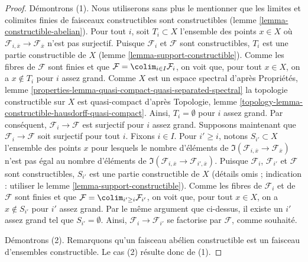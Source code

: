 \begin{proof}
Démontrons (1). Nous utiliserons sans plus le mentionner que les limites
et colimites finies de faisceaux constructibles sont constructibles
(lemme \ref{lemma-constructible-abelian}).
Pour tout $i$, soit $T_i \subset X$ l'ensemble des points $x \in X$
où $\mathcal{F}_{i, \overline{x}} \to \mathcal{F}_{\overline{x}}$
n'est pas surjectif. Puisque $\mathcal{F}_i$ et $\mathcal{F}$ sont
constructibles, $T_i$ est une partie constructible de $X$
(lemme \ref{lemma-support-constructible}).
Comme les fibres de $\mathcal{F}$ sont finies
et que $\mathcal{F} = \colim_{i \in I} \mathcal{F}_i$, on voit
que, pour tout $x \in X$, on a $x \not \in T_i$ pour $i$ assez grand.
Comme $X$ est un espace spectral d'après Propriétés, lemme
\ref{properties-lemma-quasi-compact-quasi-separated-spectral}
la topologie constructible sur $X$ est quasi-compact d'après
Topologie, lemme \ref{topology-lemma-constructible-hausdorff-quasi-compact}.
Ainsi, $T_i = \emptyset$ pour $i$ assez grand. Par conséquent,
$\mathcal{F}_i \to \mathcal{F}$ est surjectif pour $i$ assez grand.
Supposons maintenant que $\mathcal{F}_i \to \mathcal{F}$ soit surjectif pour tout $i$.
Fixons $i \in I$. Pour $i' \geq i$, notons $S_{i'} \subset X$ l'ensemble des
points $x$ pour lesquels le nombre d'éléments de
$\Im(\mathcal{F}_{i, \overline{x}} \to \mathcal{F}_{\overline{x}})$
n'est pas égal au nombre d'éléments de
$\Im(\mathcal{F}_{i, \overline{x}} \to \mathcal{F}_{i', \overline{x}})$.
Puisque $\mathcal{F}_i$, $\mathcal{F}_{i'}$ et $\mathcal{F}$ sont
constructibles, $S_{i'}$ est une partie constructible de $X$
(détails omis ; indication : utiliser le lemme \ref{lemma-support-constructible}).
Comme les fibres de $\mathcal{F}_i$ et de $\mathcal{F}$
sont finies et que $\mathcal{F} = \colim_{i' \geq i} \mathcal{F}_{i'}$,
on voit que, pour tout $x \in X$, on a $x \not \in S_{i'}$ pour $i'$
assez grand. Par le même argument que ci-dessus, il existe un $i'$ assez grand
tel que $S_{i'} = \emptyset$. Ainsi, $\mathcal{F}_i \to \mathcal{F}_{i'}$
se factorise par $\mathcal{F}$, comme souhaité.

\medskip\noindent
Démontrons (2). Remarquons qu'un faisceau abélien constructible est un faisceau
d'ensembles constructible. Le cas (2) résulte donc de (1).


\end{proof}
